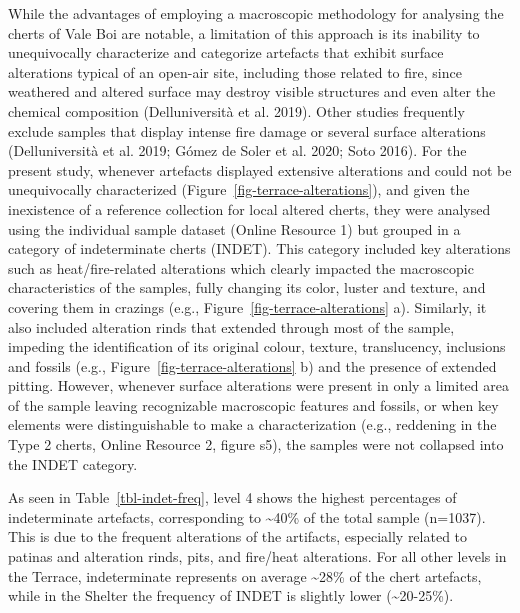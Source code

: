 \documentclass[
  a4paper,
  DIV=11,
  numbers=noendperiod]{scrreprt}
\begin{document}
While the advantages of employing a macroscopic methodology for
analysing the cherts of Vale Boi are notable, a limitation of this
approach is its inability to unequivocally characterize and categorize
artefacts that exhibit surface alterations typical of an open-air site,
including those related to fire, since weathered and altered surface may
destroy visible structures and even alter the chemical composition
(Delluniversità et al. 2019). Other studies frequently exclude samples
that display intense fire damage or several surface alterations
(Delluniversità et al. 2019; Gómez de Soler et al. 2020; Soto 2016). For
the present study, whenever artefacts displayed extensive alterations
and could not be unequivocally characterized
(Figure~\ref{fig-terrace-alterations}), and given the inexistence of a
reference collection for local altered cherts, they were analysed using
the individual sample dataset (Online Resource 1) but grouped in a
category of indeterminate cherts (INDET). This category included key
alterations such as heat/fire-related alterations which clearly impacted
the macroscopic characteristics of the samples, fully changing its
color, luster and texture, and covering them in crazings (e.g.,
Figure~\ref{fig-terrace-alterations} a). Similarly, it also included
alteration rinds that extended through most of the sample, impeding the
identification of its original colour, texture, translucency, inclusions
and fossils (e.g., Figure~\ref{fig-terrace-alterations} b) and the
presence of extended pitting. However, whenever surface alterations were
present in only a limited area of the sample leaving recognizable
macroscopic features and fossils, or when key elements were
distinguishable to make a characterization (e.g., reddening in the Type
2 cherts, Online Resource 2, figure s5), the samples were not collapsed
into the INDET category.

As seen in Table~\ref{tbl-indet-freq}, level 4 shows the highest
percentages of indeterminate artefacts, corresponding to
\textasciitilde40\% of the total sample (n=1037). This is due to the
frequent alterations of the artifacts, especially related to patinas and
alteration rinds, pits, and fire/heat alterations. For all other levels
in the Terrace, indeterminate represents on average \textasciitilde28\%
of the chert artefacts, while in the Shelter the frequency of INDET is
slightly lower (\textasciitilde20-25\%).
\end{document}
